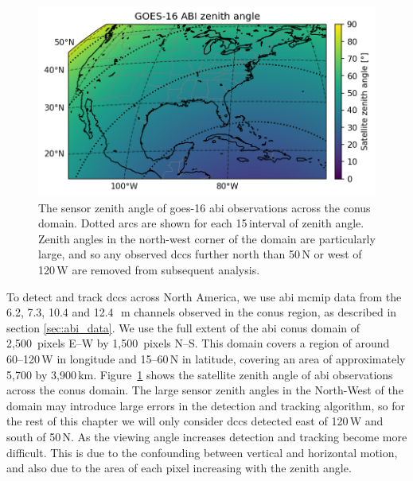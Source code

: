 \begin{figure}[tp]
    \centering
    \includegraphics[width=\textwidth]{figures/ch2_01.png}
    \caption[
    The sensor zenith angle of \acrshort{goes}-16 \acrshort{abi} observations across the \acrshort{conus} domain
    ]{
    The sensor zenith angle of \acrshort{goes}-16 \acrshort{abi} observations across the \acrshort{conus} domain. Dotted arcs are shown for each 15\,\textdegree interval of zenith angle. Zenith angles in the north-west corner of the domain are particularly large, and so any observed \acrshort{dcc}s further north than 50\,\textdegree N or west of 120\,\textdegree W are removed from subsequent analysis.
    }
    \label{fig:abi_zenith_angles}
\end{figure}

To detect and track \acrshort{dcc}s across North America, we use \acrshort{abi} \acrshort{mcmip} data from the 6.2, 7.3, 10.4 and 12.4\,\unit{\mu m} channels observed in the \acrshort{conus} region, as described in section \ref{sec:abi_data}.
We use the full extent of the \acrshort{abi} \acrshort{conus} domain of 2,500~pixels E--W by 1,500~pixels N--S.
This domain covers a region of around 60--120\,\textdegree W in longitude and 15--60\,\textdegree N in latitude, covering an area of approximately 5,700 by 3,900\,\unit{km}.
Figure~\ref{fig:abi_zenith_angles} shows the satellite zenith angle of \acrshort{abi} observations across the \acrshort{conus} domain.
The large sensor zenith angles in the North-West of the domain may introduce large errors in the detection and tracking algorithm, so for the rest of this chapter we will only consider \acrshort{dcc}s detected east of 120\,\textdegree W and south of 50\,\textdegree N.
As the viewing angle increases detection and tracking become more difficult.
This is due to the confounding between vertical and horizontal motion, and also due to the area of each pixel increasing with the zenith angle.

